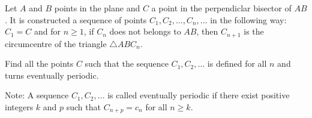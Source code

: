 Let $A$ and $B$ points in the plane and $C$ a point in the perpendiclar bisector of $AB$. It is constructed a sequence of points $C_1,C_2,\dots, C_n,\dots$ in the following way: $C_1=C$ and for $n\geq1$,  if $C_n$ does not belongs to $AB$,  then $C_{n+1}$ is the circumcentre of the triangle $\triangle{ABC_n}$.

Find all the points $C$ such that the sequence $C_1,C_2,\dots$ is defined for all $n$ and turns eventually periodic.

Note: A sequence $C_1,C_2, \dots$ is called eventually periodic if there exist positive integers $k$ and $p$ such that $C_{n+p}=c_n$ for all $n\geq{k}$.
